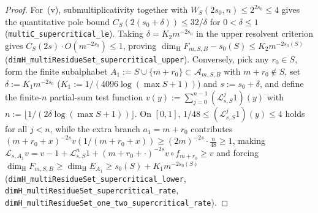 \documentclass[11pt]{article}
\theoremstyle{definition}
\theoremstyle{remark}
\newcommand{\dimH}{\dim_{\mathrm{H}}}
\begin{document}
\begin{proof}
For~(v), submultiplicativity together with $W_S(2s_0,n)\le 2^{2s_0}\le 4$ gives
the quantitative pole bound $C_S(2(s_0+\delta))\le 32/\delta$ for
$0<\delta\le1$ (\texttt{multiC\_\allowbreak supercritical\_\allowbreak le}).
Taking $\delta=K_2 m^{-2s_0}$ in the upper resolvent criterion gives
$C_S(2s)\cdot O(m^{-2s_0})\le 1$, proving
$\dimH F_{m,S,B}-s_0(S)\le K_2 m^{-2s_0(S)}$
(\texttt{dimH\_\allowbreak multiResidueSet\_\allowbreak supercritical\_\allowbreak upper}).
Conversely, pick any $r_0\in S$, form the finite subalphabet $A_1:=S\cup\{m+r_0\}\subset\mathcal A_{m,S,B}$
with $m+r_0\notin S$, set $\delta:=K_1 m^{-2s_0}$ ($K_1:=1/(4096\log(\max S+1))$)
and $s:=s_0+\delta$, and define the finite-$n$ partial-sum test function
$v(y):=\sum_{j=0}^{n-1}(\mathcal L_{s,S}^j 1)(y)$ with $n:=\lfloor 1/(2\delta\log(\max S+1))\rfloor$.
On $[0,1]$, $1/48\le (\mathcal L_{s,S}^j 1)(y)\le 4$ holds for all $j<n$, while
the extra branch $a_1=m+r_0$ contributes
$(m+r_0+x)^{-2s}v(1/(m+r_0+x))\ge (2m)^{-2s}\cdot\frac{n}{48}\ge 1$, making
$\mathcal L_{s,A_1}v=v-1+\mathcal L_{s,S}^n 1+(m+r_0+\cdot)^{-2s}v\circ f_{m+r_0}\ge v$
and forcing $\dimH F_{m,S,B}\ge\dimH E_{A_1}\ge s_0(S)+K_1 m^{-2s_0(S)}$
(\texttt{dimH\_\allowbreak multiResidueSet\_\allowbreak supercritical\_\allowbreak lower},
\texttt{dimH\_\allowbreak multiResidueSet\_\allowbreak supercritical\_\allowbreak rate},
\texttt{dimH\_\allowbreak multiResidueSet\_\allowbreak one\_\allowbreak two\_\allowbreak supercritical\_\allowbreak rate}).
\end{proof}
\end{document}
